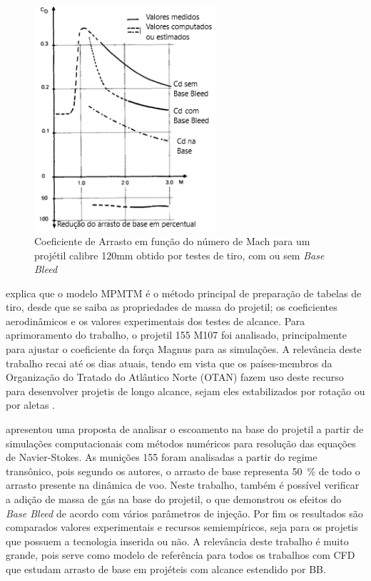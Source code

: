 \begin{figure}[!ht]
	\centering
    \includegraphics[width=0.6\textwidth]{foto05-grafico2-andersson1976.png}
	\caption[Coeficiente de Arrasto em função do número de Mach para um projétil calibre 120mm obtido por testes de tiro, com ou sem \textit{Base Bleed}.]{Coeficiente de Arrasto em função do número de Mach para um projétil calibre 120mm obtido por testes de tiro, com ou sem \textit{Base Bleed} \cite{Andersson1976}}
	\label{fig5:andersson1976}
\end{figure}

\cite{Lieske1966} explica que o modelo MPMTM é o método principal de preparação de tabelas de tiro, desde que se saiba as propriedades de massa do projetil; os coeficientes aerodinâmicos e os valores experimentais dos testes de alcance. Para aprimoramento do trabalho, o projetil \qty{155}{\millimetre} M107 foi analisado, principalmente para ajustar o coeficiente da força Magnus para as simulações. A relevância deste trabalho recai até os dias atuais, tendo em vista que os países-membros da Organização do Tratado do Atlântico Norte (OTAN) fazem uso deste recurso para desenvolver projetis de longo alcance, sejam eles estabilizados por rotação ou por aletas \cite{stanag4355}.

\cite{Sahu1985} apresentou uma proposta de analisar o escoamento na base do projetil a partir de simulações computacionais com métodos numéricos para resolução das equações de Navier-Stokes. As munições \qty{155}{\millimetre} foram analisadas a partir do regime transônico, pois segundo os autores, o arrasto de base representa \qty{50}{\percent} de todo o arrasto presente na dinâmica de voo. Neste trabalho, também é possível verificar a adição de massa de gás na base do projetil, o que demonstrou os efeitos do \textit{Base Bleed} de acordo com vários parâmetros de injeção. Por fim os resultados são comparados valores experimentais e recursos semiempíricos, seja para os projetis que possuem a tecnologia inserida ou não. A relevância deste trabalho é muito grande, pois serve como modelo de referência para todos os trabalhos com CFD que estudam arrasto de base em projéteis com alcance estendido por BB.

